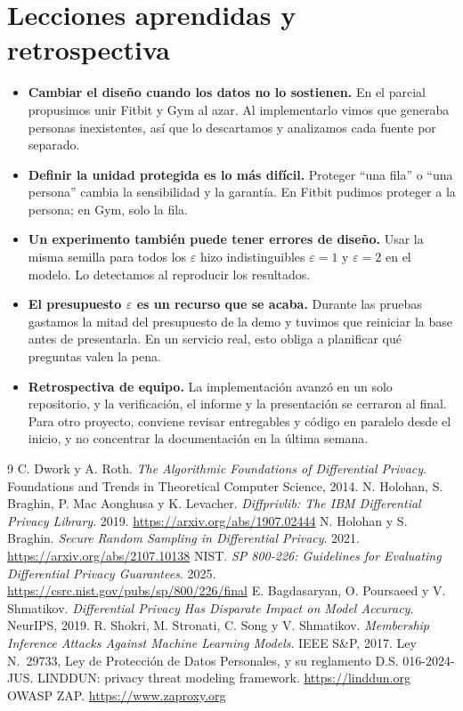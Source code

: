 \documentclass[11pt]{article}
\begin{document}
\section{Lecciones aprendidas y retrospectiva}
\label{sec:lecciones}
\begin{itemize}[nosep]
  \item \textbf{Cambiar el diseño cuando los datos no lo sostienen.} En el parcial propusimos unir Fitbit y Gym al azar. Al implementarlo vimos que generaba personas inexistentes, así que lo descartamos y analizamos cada fuente por separado.
  \item \textbf{Definir la unidad protegida es lo más difícil.} Proteger ``una fila'' o ``una persona'' cambia la sensibilidad y la garantía. En Fitbit pudimos proteger a la persona; en Gym, solo la fila.
  \item \textbf{Un experimento también puede tener errores de diseño.} Usar la misma semilla para todos los $\varepsilon$ hizo indistinguibles $\varepsilon = 1$ y $\varepsilon = 2$ en el modelo. Lo detectamos al reproducir los resultados.
  \item \textbf{El presupuesto $\varepsilon$ es un recurso que se acaba.} Durante las pruebas gastamos la mitad del presupuesto de la demo y tuvimos que reiniciar la base antes de presentarla. En un servicio real, esto obliga a planificar qué preguntas valen la pena.
  \item \textbf{Retrospectiva de equipo.} La implementación avanzó en un solo repositorio, y la verificación, el informe y la presentación se cerraron al final. Para otro proyecto, conviene revisar entregables y código en paralelo desde el inicio, y no concentrar la documentación en la última semana.
\end{itemize}

\begin{thebibliography}{9}
 C. Dwork y A. Roth. \emph{The Algorithmic Foundations of Differential Privacy}. Foundations and Trends in Theoretical Computer Science, 2014.
 N. Holohan, S. Braghin, P. Mac Aonghusa y K. Levacher. \emph{Diffprivlib: The IBM Differential Privacy Library}. 2019. \url{https://arxiv.org/abs/1907.02444}
 N. Holohan y S. Braghin. \emph{Secure Random Sampling in Differential Privacy}. 2021. \url{https://arxiv.org/abs/2107.10138}
 NIST. \emph{SP 800-226: Guidelines for Evaluating Differential Privacy Guarantees}. 2025. \url{https://csrc.nist.gov/pubs/sp/800/226/final}
 E. Bagdasaryan, O. Poursaeed y V. Shmatikov. \emph{Differential Privacy Has Disparate Impact on Model Accuracy}. NeurIPS, 2019.
 R. Shokri, M. Stronati, C. Song y V. Shmatikov. \emph{Membership Inference Attacks Against Machine Learning Models}. IEEE S\&P, 2017.
 Ley N.\textdegree{}~29733, Ley de Protección de Datos Personales, y su reglamento D.S. 016-2024-JUS.
 LINDDUN: privacy threat modeling framework. \url{https://linddun.org}
 OWASP ZAP. \url{https://www.zaproxy.org}
\end{thebibliography}
\end{document}
